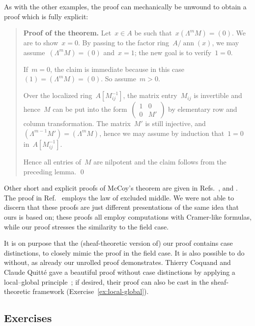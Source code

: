 \documentclass{ws-rv9x6}
\renewcommand{\_}{\mathpunct{.}}
\newcommand{\?}{\,{:}\,}
\newcommand{\ann}{\operatorname{ann}}
\begin{document}
As with the other examples, the proof can mechanically be unwound to obtain a proof
which is fully explicit:

\begin{quote}
\textbf{Proof of the theorem.} Let~$x \in A$ be such that~$x (\Lambda^m M) = (0)$. We are to
show~$x = 0$. By passing to the factor ring~$A/\ann(x)$, we may
assume~$(\Lambda^m M) = (0)$ and~$x = 1$; the new goal is to verify~$1 = 0$.

If~$m = 0$, the claim is immediate because in this case~$(1) = (\Lambda^m M) =
(0)$. So assume~$m > 0$.

Over the localized ring~$A[M_{ij}^{-1}]$, the matrix entry~$M_{ij}$ is
invertible and hence~$M$ can be put into the
form~$\left(\begin{smallmatrix}1&0\\0&M'\end{smallmatrix}\right)$ by elementary
row and column transformation. The matrix~$M'$ is still injective,
and~$(\Lambda^{m-1} M') = (\Lambda^m M)$, hence we may assume by induction
that~$1 = 0$ in~$A[M_{ij}^{-1}]$.

Hence all entries of~$M$ are nilpotent and the claim follows from the preceding
lemma. \qed
\end{quote}

Other short and explicit proofs of McCoy's theorem are given in
Refs.~,
\cite[Theorem~5.22]{lombardi-quitte:constructive-algebra} and
\cite[Exercise~5.23A(3)]{lam:exercises}. The proof in
Ref.~\cite[Proposition~III.8.2.3]{bourbaki:alg} employs the law of excluded
middle. We were not able to discern that these proofs are just different
presentations of the same idea that ours is based on; these proofs all employ
computations with Cramer-like formulas, while our proof stresses the similarity
to the field case.

It is on purpose that the (sheaf-theoretic version of) our proof contains case
distinctions, to closely mimic the proof in the field case. It is also
possible to do without, as already our unrolled proof demonstrates. Thierry
Coquand and Claude Quitté gave a beautiful proof without case distinctions by
applying a local--global
principle~\cite[Theorem~2.4]{coquand-quitte:constructive-finite-free-resolutions};
if desired, their proof can also be cast in the sheaf-theoretic framework
(Exercise~\ref{ex:local-global}).


\subsection*{Exercises}
\end{document}
